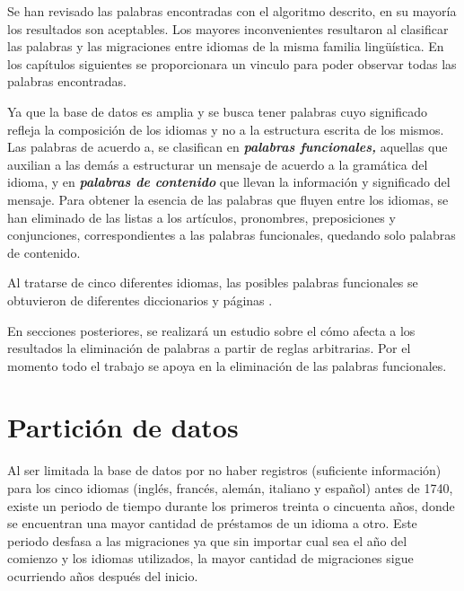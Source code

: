 Se han revisado las palabras encontradas con el algoritmo descrito, en su
mayoría los resultados son aceptables. Los mayores inconvenientes resultaron al
clasificar las palabras y las migraciones entre idiomas de la misma familia
lingüística.  En los capítulos siguientes se proporcionara un vinculo para
poder observar todas las palabras encontradas. 

Ya que  la base de datos es amplia y se busca tener palabras cuyo significado
refleja la composición de los idiomas y no a la estructura escrita de los
mismos. Las
palabras de acuerdo a\cite{contenidopal}, se clasifican en 
\textbf{\textit{palabras funcionales,}} aquellas que auxilian a las demás a
estructurar un mensaje de acuerdo a la gramática del idioma, y en
\textbf{\textit{palabras de contenido}} que llevan la información y significado
del mensaje. Para obtener la esencia de las palabras que fluyen entre los
idiomas, se han eliminado de las listas a los artículos, pronombres,
preposiciones y conjunciones, correspondientes a las palabras funcionales,
quedando solo palabras de contenido. 

Al tratarse de cinco diferentes idiomas, las posibles palabras funcionales se
obtuvieron de diferentes diccionarios y páginas \cite{englishdic, frenchdic,
germandic, italiandic, spanishdic}.

En secciones posteriores, se realizará un estudio sobre el cómo afecta a los
resultados la eliminación de palabras a partir de reglas arbitrarias.  Por el
momento todo el trabajo se apoya en la eliminación de las palabras funcionales.
\section{Partición de datos} %


Al ser limitada la base de datos por no haber registros (suficiente
información) para los cinco idiomas (inglés, francés, alemán, italiano y
español) antes de 1740,  existe un periodo de tiempo durante los primeros
treinta o cincuenta años, donde se encuentran una mayor cantidad de préstamos
de un idioma a otro. Este periodo desfasa a  las migraciones ya que sin
importar cual sea el año del comienzo y los idiomas utilizados,  la mayor
cantidad de migraciones sigue ocurriendo años después del inicio.   

